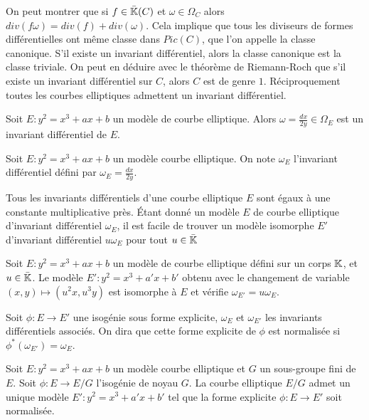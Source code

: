 \begin{Rem}
	On peut montrer que si $f\in\bar{\mathbb{K}}(C)$ et $\omega\in\Omega_{C}$ alors $div(f\omega) = div(f) + div(\omega)$. Cela implique que tous les diviseurs de formes différentielles ont même classe dans $Pic(C)$, que l'on appelle la classe canonique. S'il existe un invariant différentiel, alors la classe canonique est la classe triviale. On peut en déduire avec le théorème de Riemann-Roch que s'il existe un invariant différentiel sur $C$, alors $C$ est de genre $1$. Réciproquement toutes les courbes elliptiques admettent un invariant différentiel.
		
\end{Rem}


\begin{Prop}
	Soit $E : y^2 = x^3 + ax + b$ un modèle de courbe elliptique. Alors $\omega = \frac{dx}{2y}\in\Omega_{E}$ est un invariant différentiel de $E$.
\end{Prop}

\begin{Def}
	Soit $E : y^2 = x^3 + ax + b$ un modèle courbe elliptique. On note $\omega_{E}$ l'invariant différentiel défini par $\omega_{E} = \frac{dx}{2y}$. 
\end{Def}

Tous les invariants différentiels d'une courbe elliptique $E$ sont égaux à une constante multiplicative près. Étant donné un modèle $E$ de courbe elliptique d'invariant différentiel $\omega_{E}$, il est facile de trouver un modèle isomorphe $E'$ d'invariant différentiel $u\omega_{E}$ pour tout $u\in\bar{\mathbb{K}}$

\begin{Rem}\label{correctionInvariantDiff}
	
	Soit $E : y^2 = x^3 + ax + b$ un modèle de courbe elliptique défini sur un corps $\mathbb{K}$, et $u\in\bar{\mathbb{K}}$. Le modèle $E' : y^2 = x^3 + a'x + b'$ obtenu avec le changement de variable $(x,y)\mapsto(u^{2}x,u^{3}y)$ est isomorphe à $E$ et vérifie $\omega_{E'} = u\omega_{E}$.
\end{Rem}


\begin{Def}	
	Soit $\phi : E\rightarrow E'$ une isogénie sous forme explicite, $\omega_{E}$ et $\omega_{E'}$ les invariants différentiels associés. On dira que cette forme explicite de $\phi$ est normalisée si $\phi^{*}(\omega_{E'}) = \omega_E$.	
\end{Def}

\begin{Prop}\label{unicitéIsogénieModèles}
	Soit $E : y^2 = x^3 + ax + b$ un modèle courbe elliptique et $G$ un sous-groupe fini de $E$. Soit $\phi : E\rightarrow E/G$ l'isogénie de noyau $G$. La courbe elliptique $E/G$ admet un unique modèle $E' : y^2 = x^3 + a'x + b'$ tel que la forme explicite $\phi : E\rightarrow E'$ soit normalisée. 
\end{Prop}

